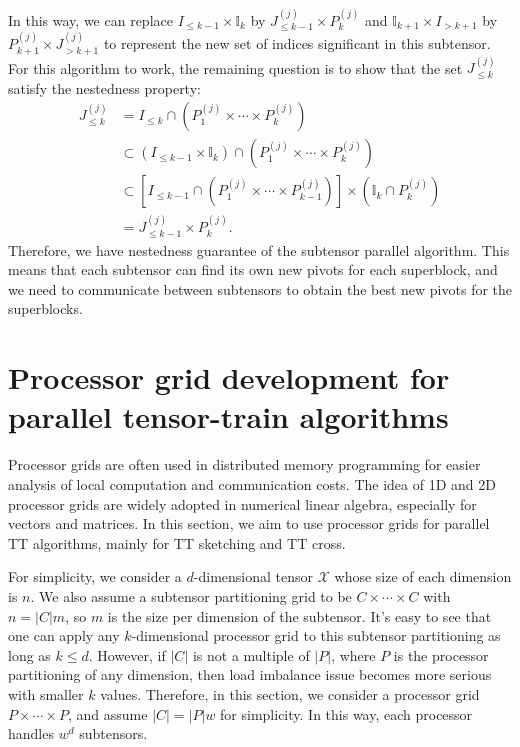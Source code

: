\documentclass[11pt,a4paper,review]{siamart220329}
\begin{document}
In this way, we can replace $I_{\le k-1}\times\mathbb{I}_k$ by $J_{\le k-1}^{(j)}\times P_k^{(j)}$ and $\mathbb{I}_{k+1}\times I_{>k+1}$ by $P_{k+1}^{(j)}\times J_{>k+1}^{(j)}$ to represent the new set of indices significant in this subtensor. For this algorithm to work, the remaining question is to show that the set $J_{\le k}^{(j)}$ satisfy the nestedness property:
\begin{align*}
J_{\le k}^{(j)} &= I_{\le k} \cap \left(P_1^{(j)} \times\cdots\times P_k^{(j)}\right) \\
&\subset (I_{\le k-1} \times \mathbb{I}_k) \cap \left(P_1^{(j)} \times\cdots\times P_k^{(j)}\right) \\
&\subset \left[I_{\le k-1} \cap \left(P_1^{(j)} \times\cdots\times P_{k-1}^{(j)}\right)\right] \times \left( \mathbb{I}_k \cap P_k^{(j)}\right) \\
&= J_{\le k-1}^{(j)} \times P_k^{(j)}.
\end{align*}
Therefore, we have nestedness guarantee of the subtensor parallel algorithm. This means that each subtensor can find its own new pivots for each superblock, and we need to communicate between subtensors to obtain the best new pivots for the superblocks.

\section{Processor grid development for parallel tensor-train algorithms}
\label{sec:subComm}
Processor grids are often used in distributed memory programming for easier analysis of local computation and communication costs. The idea of 1D and 2D processor grids are widely adopted in numerical linear algebra, especially for vectors and matrices. In this section, we aim to use processor grids for parallel TT algorithms, mainly for TT sketching and TT cross.

For simplicity, we consider a $d$-dimensional tensor $\mathcal{X}$ whose size of each dimension is $n$. We also assume a subtensor partitioning grid to be $C \times \cdots \times C$ with $n = |C|m$, so $m$ is the size per dimension of the subtensor. It's easy to see that one can apply any $k$-dimensional processor grid to this subtensor partitioning as long as $k \le d$. However, if $|C|$ is not a multiple of $|P|$, where $P$ is the processor partitioning of any dimension, then load imbalance issue becomes more serious with smaller $k$ values. Therefore, in this section, we consider a processor grid $P \times \cdots \times P$, and assume $|C|=|P|w$ for simplicity. In this way, each processor handles $w^d$ subtensors.
\end{document}
